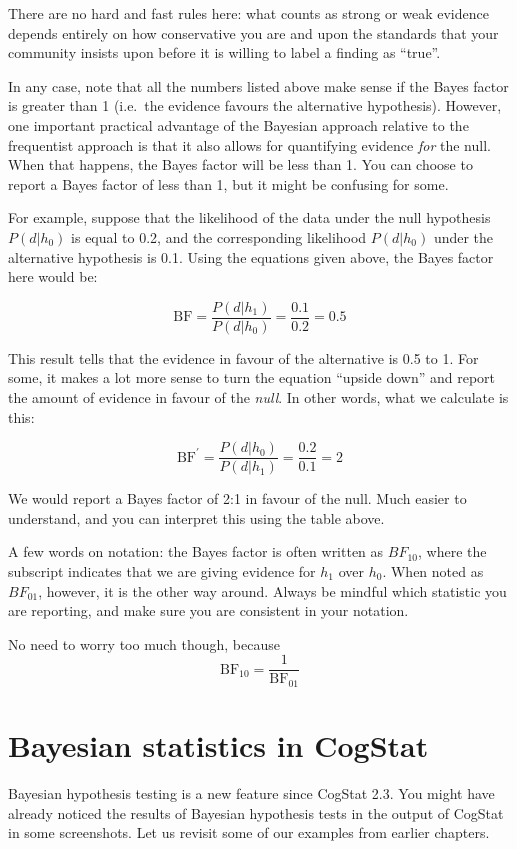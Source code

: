 \documentclass[
  11pt,
  a4paper,
  twoside,symmetric,openright]{book}
\theoremstyle{break}
\theoremstyle{break}
\begin{document}
There are no hard and fast rules here: what counts as strong or weak evidence depends entirely on how conservative you are and upon the standards that your community insists upon before it is willing to label a finding as ``true''.

In any case, note that all the numbers listed above make sense if the Bayes factor is greater than 1 (i.e.~the evidence favours the alternative hypothesis). However, one important practical advantage of the Bayesian approach relative to the frequentist approach is that it also allows for quantifying evidence \emph{for} the null. When that happens, the Bayes factor will be less than 1. You can choose to report a Bayes factor of less than 1, but it might be confusing for some.

For example, suppose that the likelihood of the data under the null hypothesis \(P(d|h_0)\) is equal to 0.2, and the corresponding likelihood \(P(d|h_0)\) under the alternative hypothesis is 0.1. Using the equations given above, the Bayes factor here would be:

\[ 
\mbox{BF} = \frac{P(d|h_1)}{P(d|h_0)} = \frac{0.1}{0.2} = 0.5
\]

This result tells that the evidence in favour of the alternative is 0.5 to 1. For some, it makes a lot more sense to turn the equation ``upside down'' and report the amount of evidence in favour of the \emph{null}. In other words, what we calculate is this:

\[ 
\mbox{BF}^\prime = \frac{P(d|h_0)}{P(d|h_1)} = \frac{0.2}{0.1} = 2
\]

We would report a Bayes factor of 2:1 in favour of the null. Much easier to understand, and you can interpret this using the table above.

A few words on notation: the Bayes factor is often written as \(BF_{10}\), where the subscript indicates that we are giving evidence for \(h_1\) over \(h_0\). When noted as \(BF_{01}\), however, it is the other way around. Always be mindful which statistic you are reporting, and make sure you are consistent in your notation.

No need to worry too much though, because
\[
\mbox{BF}_{10} = \frac{1}{\mbox{BF}_{01}}
\]

\section{Bayesian statistics in CogStat}\label{bayesian-statistics-in-cogstat}

Bayesian hypothesis testing is a new feature since CogStat 2.3. You might have already noticed the results of Bayesian hypothesis tests in the output of CogStat in some screenshots. Let us revisit some of our examples from earlier chapters.
\end{document}
